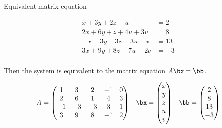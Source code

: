 \documentclass{beamer}
\begin{document}
\begin{frame}{Equivalent matrix equation}

\begin{align*}
 x + 3y + 2z - u  \qquad &= 2 \\
2x + 6y + z + 4u + 3v  &= 8 \\
-x -3y  -3z + 3u + v  &= 13 \\
3x + 9y + 8z  -7u + 2v  &= -3 \\
\end{align*}

Then the system is equivalent to the matrix equation $A \bx = \bb$.

$$
\begin{matrix}
A =
\begin{pmatrix}
1 & 3 & 2 & -1 & 0 \\
2 & 6 & 1 & 4 & 3\\
-1 & -3 & -3 & 3 & 1 \\
3 & 9 & 8 & -7 & 2
\end{pmatrix}
&
\bx =
\begin{pmatrix}
x \\ y \\ z \\ u \\ v
\end{pmatrix}
&
\bb =
\begin{pmatrix}
2 \\ 8 \\ 13 \\ -3
\end{pmatrix}
\end{matrix}
$$

\end{frame}
\end{document}
